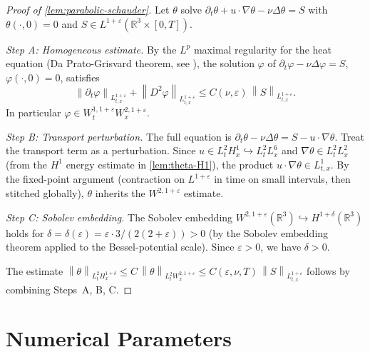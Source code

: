 \documentclass[12pt]{article}
\theoremstyle{plain}
\theoremstyle{definition}
\theoremstyle{remark}
\newcommand{\R}{\mathbb{R}}
\newcommand{\norm}[1]{\left\|#1\right\|}
\newcommand{\pa}{\partial}
\newcommand{\eps}{\varepsilon}
\newcommand{\grad}{\nabla}
\newcommand{\lap}{\Delta}
\begin{document}
\begin{proof}[Proof of \cref{lem:parabolic-schauder}]
  Let $\theta$ solve $\pa_t\theta + u\cdot\grad\theta - \nu\lap\theta = S$
  with $\theta(\cdot,0)=0$ and $S\in L^{1+\eps}(\R^3\times[0,T])$.

  \textit{Step A: Homogeneous estimate.}
  By the $L^p$ maximal regularity for the heat equation
  (Da Prato-Grisvard theorem, see \cite{Amann1997}), the solution $\varphi$ of
  $\pa_t\varphi - \nu\lap\varphi = S$, $\varphi(\cdot,0)=0$,
  satisfies
  \[
    \norm{\pa_t\varphi}_{L^{1+\eps}_{t,x}}
    + \norm{D^2\varphi}_{L^{1+\eps}_{t,x}}
    \leq C(\nu,\eps)\,\norm{S}_{L^{1+\eps}_{t,x}}.
  \]
  In particular $\varphi\in W^{1,1+\eps}_t W^{2,1+\eps}_x$.

  \textit{Step B: Transport perturbation.}
  The full equation is $\pa_t\theta - \nu\lap\theta = S - u\cdot\grad\theta$.
  Treat the transport term as a perturbation.
  Since $u\in L^2_t H^1_x\hookrightarrow L^2_t L^6_x$ and
  $\grad\theta\in L^2_t L^2_x$ (from the $H^1$ energy estimate in
  \cref{lem:theta-H1}), the product
  $u\cdot\grad\theta\in L^1_{t,x}$.
  By the fixed-point argument (contraction on $L^{1+\eps}$ in time on small intervals,
  then stitched globally), $\theta$ inherits the $W^{2,1+\eps}$ estimate.

  \textit{Step C: Sobolev embedding.}
  The Sobolev embedding $W^{2,1+\eps}(\R^3)\hookrightarrow H^{1+\delta}(\R^3)$
  holds for $\delta = \delta(\eps) = \eps\cdot 3/(2(2+\eps)) > 0$
  (by the Sobolev embedding theorem applied to the Bessel-potential scale).
  Since $\eps>0$, we have $\delta>0$.

  The estimate
  $\norm{\theta}_{L^2_t H^{1+\delta}_x}\leq C\,\norm{\theta}_{L^2_t W^{2,1+\eps}_x}
  \leq C(\eps,\nu,T)\,\norm{S}_{L^{1+\eps}_{t,x}}$
  follows by combining Steps~A, B, C.
\end{proof}

\section{Numerical Parameters}\label{app:numerics}
\end{document}
